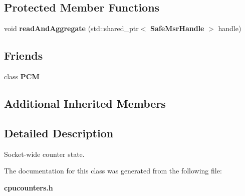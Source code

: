 \subsection*{Protected Member Functions}
\begin{DoxyCompactItemize}
\item 
\mbox{\label{classSocketCounterState_a43ee7028fd4f9ae929ed5b575e60aadb}} 
void {\bfseries read\+And\+Aggregate} (std\+::shared\+\_\+ptr$<$ \textbf{ Safe\+Msr\+Handle} $>$ handle)
\end{DoxyCompactItemize}
\subsection*{Friends}
\begin{DoxyCompactItemize}
\item 
\mbox{\label{classSocketCounterState_ab5f56d2e95ba3daf52c17b8a1d356d64}} 
class {\bfseries P\+CM}
\end{DoxyCompactItemize}
\subsection*{Additional Inherited Members}


\subsection{Detailed Description}
Socket-\/wide counter state. 

The documentation for this class was generated from the following file\+:\begin{DoxyCompactItemize}
\item 
\textbf{ cpucounters.\+h}\end{DoxyCompactItemize}
